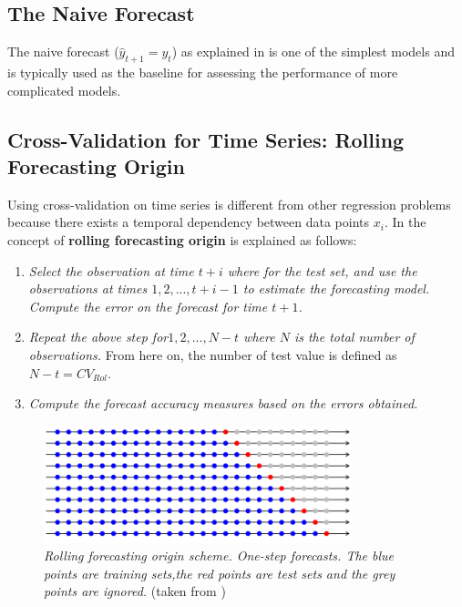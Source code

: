 \subsection{The Naive Forecast}

The naive forecast ($\hat{y}_{t+1}=y_{t}$) as explained in \cite{makridakis2008forecasting} is one of the simplest models and is typically used as the baseline for assessing the performance of more complicated models.


\subsection{Cross-Validation for Time Series: Rolling Forecasting Origin}

Using cross-validation on time series is different from other regression problems because there exists a temporal dependency between data points $x_{i}$. In \cite{hyndman2006another} the concept of \textbf{rolling forecasting origin} is explained as follows:

\begin{enumerate}
	\item \textit{ Select the observation at time $t + i$ where for the test set, and use the observations at times $1, 2, . . . , t+i-1$ to estimate the forecasting model. Compute the error on the forecast for time $t + 1$.}
	\item \textit{ Repeat the above step for$1, 2, . . . , N-t$ where $N$ is the total number of observations.} From here on, the number of test value is defined as $N-t=CV_{Rol}$.
	\item \textit{ Compute the forecast accuracy measures based on the errors obtained.}
\end{enumerate}

\begin{figure}[htpb!] %
	\centering %
	\includegraphics[width=0.8\textwidth]{data/cv_time.png} %
	\caption{\textit{ Rolling forecasting origin scheme. One-step forecasts. The blue points are training sets,the red points are test sets and the grey points are ignored.} (taken from \cite{hyndman2006another} )} %
	\label{fig:cross validation} %
\end{figure}



